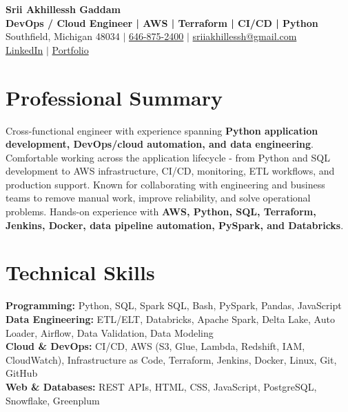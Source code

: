\documentclass[letterpaper,10pt]{article}
\begin{document}
\fontsize{9.35pt}{10.45pt}\selectfont

\begin{center}
    {\LARGE \textbf{Srii Akhillessh Gaddam}} \\[-1pt]
    \textbf{DevOps / Cloud Engineer | AWS | Terraform | CI/CD | Python} \\[2pt]
    Southfield, Michigan 48034 $|$
    \href{tel:6468752400}{646-875-2400} $|$
    \href{mailto:sriiakhillessh@gmail.com}{sriiakhillessh@gmail.com} \\[1pt]
    \href{https://www.linkedin.com/in/srii-akhiilessh-gaddam-b48668191/}{LinkedIn} $|$
    \href{https://sriiakhillesshg.github.io/portfolio/}{Portfolio}
\end{center}
\vspace{-8pt}

\section{Professional Summary}
\small{Cross-functional engineer with experience spanning \textbf{Python application development, DevOps/cloud automation, and data engineering}. Comfortable working across the application lifecycle - from Python and SQL development to AWS infrastructure, CI/CD, monitoring, ETL workflows, and production support. Known for collaborating with engineering and business teams to remove manual work, improve reliability, and solve operational problems. Hands-on experience with \textbf{AWS, Python, SQL, Terraform, Jenkins, Docker, data pipeline automation, PySpark, and Databricks}.}

\section{Technical Skills}
\small{
\textbf{Programming:} Python, SQL, Spark SQL, Bash, PySpark, Pandas, JavaScript \\
\textbf{Data Engineering:} ETL/ELT, Databricks, Apache Spark, Delta Lake, Auto Loader, Airflow, Data Validation, Data Modeling \\
\textbf{Cloud \& DevOps:} CI/CD, AWS (S3, Glue, Lambda, Redshift, IAM, CloudWatch), Infrastructure as Code, Terraform, Jenkins, Docker, Linux, Git, GitHub \\
\textbf{Web \& Databases:} REST APIs, HTML, CSS, JavaScript, PostgreSQL, Snowflake, Greenplum
}
\end{document}
